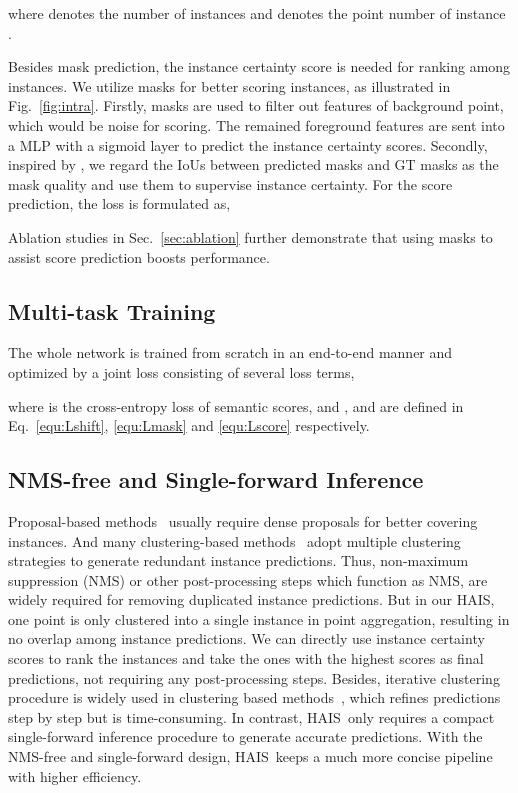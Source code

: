 \documentclass[10pt,twocolumn,letterpaper]{article}
\newcommand{\thename}{HAIS}
\begin{document}
where  denotes the number of instances and  denotes the point number of instance .

Besides mask prediction, the instance certainty score is needed for ranking among instances. We utilize masks for better scoring instances, as illustrated in Fig.~\ref{fig:intra}.
Firstly, masks are used to filter out features of background point, which would be noise for scoring. The remained foreground features are sent into a MLP with a sigmoid layer to predict the instance certainty scores. Secondly, inspired by \cite{MSRCNN, IOUNet, GS3D}, we regard the IoUs between predicted masks and GT masks as the mask quality and use them to supervise instance certainty.
For the score prediction, the loss is formulated as,

Ablation studies in Sec.~\ref{sec:ablation} further demonstrate that using masks to assist score prediction boosts performance.

\subsection{Multi-task Training}
The whole network is trained from scratch in an end-to-end manner and optimized by a joint loss consisting of several loss terms,

where  is the cross-entropy loss of semantic scores, and ,  and  are defined in Eq.~\ref{equ:Lshift}, \ref{equ:Lmask} and \ref{equ:Lscore} respectively.

\subsection{NMS-free and Single-forward Inference}
Proposal-based methods~\cite{3D-MPA,GICN} usually require dense proposals for better covering instances. And many clustering-based methods~\cite{MTML,PointGroup} adopt multiple clustering strategies to generate redundant instance predictions. Thus, non-maximum suppression (NMS) or other post-processing steps which function as NMS, are widely required for removing duplicated instance predictions.
But in our \thename, one point is only clustered into a single instance in point aggregation, resulting in no overlap among instance predictions. We can directly use instance certainty scores to rank the instances and take the ones with the highest scores as final predictions, not requiring any post-processing steps.
Besides, iterative clustering procedure is widely used in clustering based methods~\cite{OccuSeg, JSIS3D}, which refines predictions step by step but is time-consuming. In contrast, \thename\ only requires a compact single-forward inference procedure to generate accurate predictions.
With the NMS-free and single-forward design, \thename\ keeps a much more concise pipeline with higher efficiency. 
\end{document}
